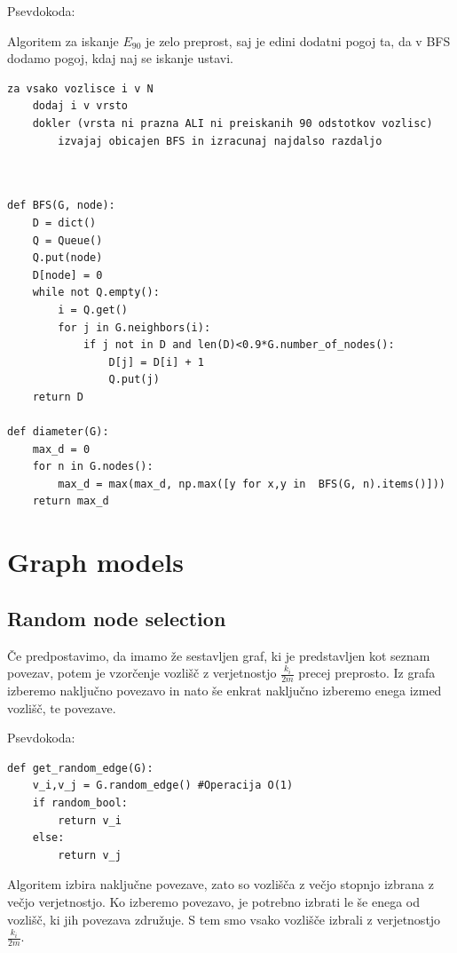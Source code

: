 \documentclass[a4paper,11pt]{article}
\begin{document}
Psevdokoda:

Algoritem za iskanje $E_{90}$ je zelo preprost, saj je edini dodatni pogoj ta, da v BFS dodamo pogoj, kdaj naj se iskanje ustavi.

\begin{lstlisting}
za vsako vozlisce i v N
	dodaj i v vrsto
	dokler (vrsta ni prazna ALI ni preiskanih 90 odstotkov vozlisc)
		izvajaj obicajen BFS in izracunaj najdalso razdaljo 
	
	
\end{lstlisting}

\begin{lstlisting}
def BFS(G, node):
    D = dict()
    Q = Queue()
    Q.put(node)
    D[node] = 0
    while not Q.empty():
        i = Q.get()
        for j in G.neighbors(i):
            if j not in D and len(D)<0.9*G.number_of_nodes():
                D[j] = D[i] + 1
                Q.put(j)
    return D

def diameter(G):
    max_d = 0
    for n in G.nodes():
        max_d = max(max_d, np.max([y for x,y in  BFS(G, n).items()]))
    return max_d
\end{lstlisting}


\section{Graph models }

\subsection{Random node selection}

Če predpostavimo, da imamo že sestavljen graf, ki je predstavljen kot seznam povezav, potem je vzorčenje vozlišč z verjetnostjo $\frac{k_i}{2m}$ precej preprosto. Iz grafa izberemo naključno povezavo in nato še enkrat naključno izberemo enega izmed vozlišč, te povezave.

Psevdokoda:
        
\begin{lstlisting}
def get_random_edge(G):
	v_i,v_j = G.random_edge() #Operacija O(1)
	if random_bool:
		return v_i
	else:
		return v_j
\end{lstlisting}

Algoritem izbira naključne povezave, zato so vozlišča z večjo stopnjo izbrana z večjo verjetnostjo. Ko izberemo povezavo, je potrebno izbrati le še enega od vozlišč, ki jih povezava združuje. S tem smo vsako vozlišče izbrali z verjetnostjo $\frac{k_i}{2m}$.
\end{document}
